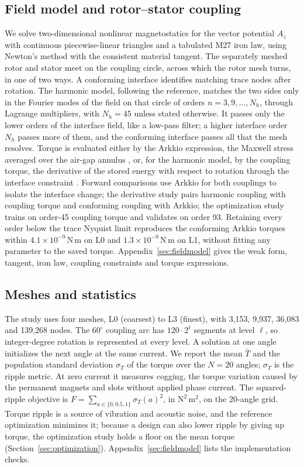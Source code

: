 \documentclass{anvil-paper}
\begin{document}
\subsection{Field model and rotor--stator coupling}
We solve two-dimensional nonlinear magnetostatics for the vector potential
$A_z$ with continuous piecewise-linear triangles and a tabulated M27 iron
law, using Newton's method with the consistent material tangent. The
separately meshed rotor and stator meet on the coupling circle, across
which the rotor mesh turns, in one of two ways. A conforming interface
identifies matching trace nodes after rotation. The harmonic model,
following the reference, matches the two sides only in the Fourier modes
of the field on that circle of orders $n=3,9,\ldots,N_h$, through Lagrange
multipliers, with $N_h=45$ unless stated otherwise. It passes only the
lower orders of the interface field, like a low-pass filter; a higher
interface order $N_h$ passes more of them, and the conforming interface
passes all that the mesh resolves. Torque is evaluated either by the
Arkkio expression, the Maxwell stress averaged over the air-gap annulus
\citep{arkkio1987}, or, for the harmonic model, by the coupling torque, the
derivative of the stored energy with respect to rotation through the
interface constraint \citep{egger2022torque}. Forward comparisons use Arkkio for both couplings
to isolate the interface change; the derivative study pairs harmonic
coupling with coupling torque and conforming coupling with Arkkio; the
optimization study trains on order-45 coupling torque and validates on
order 93. Retaining every order below the trace Nyquist limit reproduces
the conforming Arkkio torques within $4.1\times10^{-9}$\,N\,m on L0 and
$1.3\times10^{-9}$\,N\,m on L1, without fitting any parameter to the saved
torque. Appendix~\ref{sec:fieldmodel} gives the weak form, tangent, iron
law, coupling constraints and torque expressions.

\subsection{Meshes and statistics}
The study uses four meshes, L0 (coarsest) to L3 (finest), with 3,153,
9,937, 36,083 and 139,268 nodes. The $60^\circ$ coupling arc has $120\cdot2^\ell$ segments at level
$\ell$, so integer-degree rotation is represented at every level.
A solution at one angle initializes the next angle at the same current.
We report the mean $\bar T$ and the population standard deviation
$\sigma_T$ of the torque over the $N=20$ angles; $\sigma_T$ is the ripple
metric. At zero current it measures
cogging, the torque variation caused by the permanent magnets and slots
without applied phase current. The squared-ripple objective is
$F=\sum_{a\in\{0,0.5,1\}}\sigma_T(a)^2$, in $\mathrm{N^2\,m^2}$, on the
20-angle grid. Torque ripple is a source of vibration and acoustic noise,
and the reference optimization minimizes it; because a design can also
lower ripple by giving up torque, the optimization study holds a floor on
the mean torque
(Section~\ref{sec:optimization}). Appendix~\ref{sec:fieldmodel} lists the
implementation checks.
\end{document}
